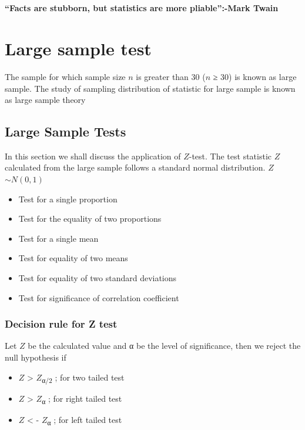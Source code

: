 \documentclass[
]{book}
\begin{document}
~\\
\hspace*{0.333em}\\
\hspace*{0.333em}

\hypertarget{hello}{}
\textbf{``Facts are stubborn, but statistics are more pliable'':-Mark Twain}

\hypertarget{large-sample-test}{%
\chapter{Large sample test}\label{large-sample-test}}

The sample for which sample size \(n\) is greater than 30 (\(n\) ≥ 30) is known as large sample. The study of sampling distribution of statistic for large sample is known as large sample theory\\

\hypertarget{large-sample-tests}{%
\section{Large Sample Tests}\label{large-sample-tests}}

In this section we shall discuss the application of \(Z\)-test. The test statistic \(Z\) calculated from the large sample follows a standard normal distribution. \(Z\) \(\sim N(0,1)\)

\begin{itemize}
\item
  Test for a single proportion
\item
  Test for the equality of two proportions
\item
  Test for a single mean
\item
  Test for equality of two means
\item
  Test for equality of two standard deviations
\item
  Test for significance of correlation coefficient
\end{itemize}

\hypertarget{decision}{%
\subsection{Decision rule for Z test}\label{decision}}

Let \(Z\) be the calculated value and α be the level of significance, then we reject the null hypothesis if

\begin{itemize}
\item
  \(Z\) \textgreater{} \(Z\)\textsubscript{α/2} ; for two tailed test
\item
  \(Z\) \textgreater{} \(Z\)\textsubscript{α} ; for right tailed test
\item
  \(Z\) \textless{} - \(Z\)\textsubscript{α} ; for left tailed test
\end{itemize}
\end{document}
